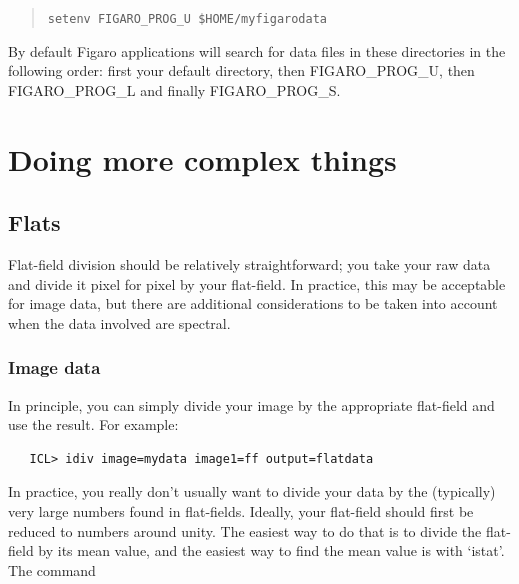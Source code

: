 \begin{quote}
{\tt setenv FIGARO\_PROG\_U \$HOME/myfigarodata}
\end{quote}

By default Figaro applications will search for data files in these
directories in the following order: first your default directory, then 
FIGARO\_PROG\_U, then FIGARO\_PROG\_L and finally FIGARO\_PROG\_S.



\newpage %
\section{\label{techniques}Doing more complex things}


\subsection{\label{techno1}Flats}

   Flat-field division should be relatively straightforward; you take
   your raw data and divide it pixel for pixel by your flat-field.  In
   practice, this may be acceptable for image data, but there are
   additional considerations to be taken into account when the data
   involved are spectral.


\subsubsection{\label{techno1image}Image data}

   In principle, you can simply divide your image by the appropriate
   flat-field and use the result.  For example:

\begin{verbatim}
   ICL> idiv image=mydata image1=ff output=flatdata
\end{verbatim}

   In practice, you really don't usually want to divide your data by
   the (typically) very large numbers found in flat-fields.  Ideally, your
   flat-field should first be reduced to numbers around unity.  The easiest
   way to do that is to divide the flat-field by its mean value, and the
   easiest way to find the mean value is with `istat'.  The command

